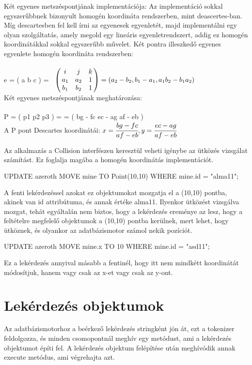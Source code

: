 Két egyenes metszéspontjának implementációja: Az implementáció sokkal egyszer\H ubbnek bizonyult homogén koordináta rendszerben, mint deascertes-ban. Míg descartesben fel kell írni az egyenesek egyenletét, majd implementálni egy olyan szolgáltatás, amely megold egy lineáris egyenletrendszert, addig ez homogén koordinátákkal sokkal egyszer\H ubb m\H uvelet.
Két pontra illeszked\H o egyenes egyenlete homogén koordináta rendszerben: 
\\
e = ( a b c ) =$ \bordermatrix{~ &  &  &  \cr
	& i & j & k\cr
	& a_1 & a_2 & 1\cr
	& b_1 & b_2 & 1\cr} = ( a_2 - b_2 , b_1 - a_1 , a_1b_2 - b_1a_2 )$
\\
Két egyenes metszéspontjának meghatározása:\\
\\
P = ( p1 p2 p3 ) =  = ( bg - fc  ec - ag  af - eb )
\\
A P pont Descartes koordinátái:
$ x = \cfrac{bg - fc}{af - eb} , y = \cfrac{ec - ag}{af - eb}$
\cite{Banya5}


Az alkalmazás a Collision interfészen keresztül veheti igénybe az ütközés vizsgálat számítást. Ez foglalja magába a homogén koordinátás implementációt.

\begin{sql}
UPDATE azeroth MOVE  mine TO Point(10,10) WHERE mine.id = "alma11"; 
\end{sql}
A fenti lekérdezéssel azokat ez objektumokat mozgatja el a (10,10) pontba, akinek van id attribútuma, és annak értéke alma11. Ilyenkor ütközést vizsgálva mozgat, tehát egyáltalán nem biztos, hogy a lekérdezés ereménye az lesz, hogy a feltételre megfelelő objektumok a (10,10) pontba kerülnek, mert lehet, hogy ütköznek, és olyankor az adatbázismotor számol nekik pozíciót.
\begin{sql}
UPDATE azeroth MOVE  mine.x TO 10 WHERE mine.id = "asd11"; 
\end{sql}
Ez a lekérdezés annyival másabb a fentinél, hogy itt nem mindkétt koordinátát módosítjuk, hanem vagy csak az x-et vagy csak az y-ont.

\section{Lekérdezés objektumok}

Az adatbázismotorhoz a beérkező lekérdezés stringként jön át, ezt a tokenizer feldolgozza, és minden csomopontnál meghív egy metódust, ami a lekérdezés objektumot építi fel. A lekérdezés objektum felépítése után meghívódik annak execute metódus, ami végrehajta azt.

